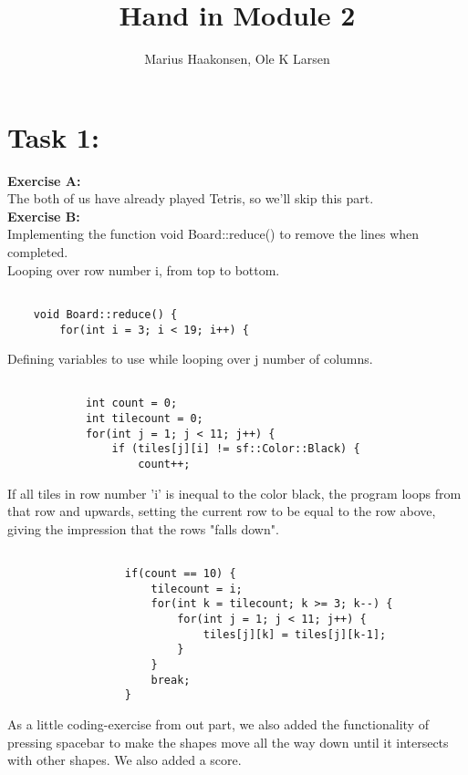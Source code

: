 \documentclass[11pt]{amsart}
\title{Hand in Module 2}
\author{Marius Haakonsen, Ole K Larsen}
\begin{document}
\maketitle

\section{Task 1:}

\textbf{Exercise A:}\\
The both of us have already played Tetris, so we'll skip this part.  \\

\textbf{Exercise B:} \\

Implementing the function void Board::reduce() to remove the lines when completed. \\

Looping over row number i, from top to bottom. \\
\begin{verbatim}

	void Board::reduce() {
	    for(int i = 3; i < 19; i++) {

\end{verbatim}

Defining variables to use while looping over j number of columns. \\
\begin{verbatim}

	        int count = 0;
	        int tilecount = 0;
	        for(int j = 1; j < 11; j++) {
	            if (tiles[j][i] != sf::Color::Black) {
	                count++;

\end{verbatim}

If all tiles in row number 'i' is inequal to the color black, the program loops from that
row and upwards, setting the current row to be equal to the row above, giving the impression that the rows "falls down". \\
\begin{verbatim}

	              if(count == 10) {
	                  tilecount = i;
	                  for(int k = tilecount; k >= 3; k--) {
	                      for(int j = 1; j < 11; j++) {
	                          tiles[j][k] = tiles[j][k-1];
	                      }
	                  }
	                  break;
	              }
\end{verbatim}

As a little coding-exercise from out part, we also added the functionality of pressing spacebar to make the shapes move all the way down until it intersects with other shapes. We also added a score.
\end{document}
